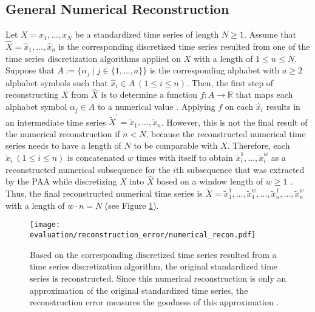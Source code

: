 \subsection*{General Numerical Reconstruction}
Let $X = x_1, ..., x_N$ be a standardized time series of length $N \geq 1$. Assume that $\hat{X} = \hat{x}_1, ..., \hat{x}_n$ is the corresponding discretized time series resulted from one of the time series discretization algorithms applied on $X$ with a length of $1 \leq n \leq N$. Suppose that $A := \{\alpha_j \mid j \in \{1, ..., a \} \}$ is the corresponding alphabet with $a \geq 2$ alphabet symbols such that $\hat{x}_i \in A \ (1 \leq i \leq n)$. Then, the first step of reconstructing $X$ from $\hat{X}$ is to determine a function $f: A \rightarrow \mathbb{R}$ that maps each alphabet symbol $\alpha_j \in A$ to a numerical value \cite{Comparison_SAX}. Applying $f$ on each $\hat{x}_i$ results in an intermediate time series $\tilde{X}^{'} = \tilde{x}_1, ..., \tilde{x}_n$. However, this is not the final result of the numerical reconstruction if $n < N$, because the reconstructed numerical time series needs to have a length of $N$ to be comparable with $X$. Therefore, each $\tilde{x}_i \ (1 \leq i \leq n)$ is concatenated $w$ times with itself to obtain $\tilde{x}_{i}^{1}, ..., \tilde{x}_{i}^{w}$ as a reconstructed numerical subsequence for the $i$th subsequence that was extracted by the \ac{PAA} while discretizing $X$ into $\hat{X}$ based on a window length of $w \geq 1$ \cite{Comparison_SAX}. Thus, the final reconstructed numerical time series is $\tilde{X} = \tilde{x}_{1}^{1}, ..., \tilde{x}_{1}^{w}, ..., \tilde{x}_{n}^{1}, ..., \tilde{x}_{n}^{w}$ with a length of $w \cdot n = N$ (see Figure \ref{fig:num_recon}).
\begin{figure}[htb]
\centering
\texttt{[image: evaluation/reconstruction\_error/numerical\_recon.pdf]}
\caption[Reconstruction Error - Numerical Reconstruction]{Based on the corresponding discretized time series resulted from a time series discretization algorithm, the original standardized time series is reconstructed. Since this numerical reconstruction is only an approximation of the original standardized time series, the reconstruction error measures the goodness of this approximation \cite{APCA}.}
\label{fig:num_recon}
\end{figure}

